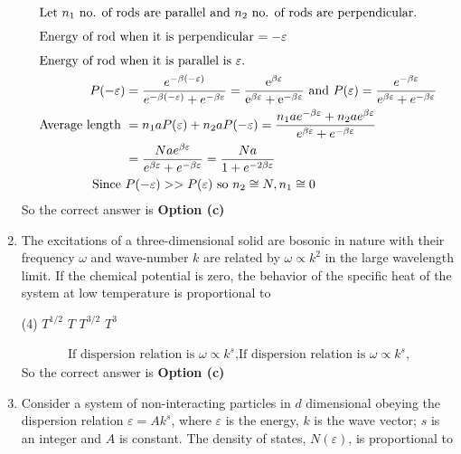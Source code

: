 \begin{enumerate}
\begin{answer}
	\begin{align*}
	\intertext{Let $n_{1}$ no. of rods are parallel and $n_{2}$ no. of rods are perpendicular.}
	\intertext{Energy of rod when it is perpendicular $=-\varepsilon$}
	\intertext{Energy of rod when it is parallel is $\varepsilon$.}
	P(-\varepsilon)&=\frac{e^{-\beta(-\varepsilon)}}{e^{-\beta(-\varepsilon)}+e^{-\beta \varepsilon}}=\frac{\mathrm{e}^{\beta \varepsilon}}{\mathrm{e}^{\beta \varepsilon}+\mathrm{e}^{-\beta \varepsilon}}\text{ and }P(\varepsilon)=\frac{e^{-\beta \varepsilon}}{e^{\beta \varepsilon}+e^{-\beta \varepsilon}}\\
	\text{Average length }&=n_{1} a P(\varepsilon)+n_{2} a P(-\varepsilon)=\frac{n_{1} a e^{-\beta \varepsilon}+n_{2} a e^{\beta \varepsilon}}{e^{\beta \varepsilon}+e^{-\beta \varepsilon}}\\&=\frac{N a e^{\beta \varepsilon}}{e^{\beta \varepsilon}+e^{-\beta \varepsilon}}=\frac{N a}{1+e^{-2 \beta \varepsilon}}\\
	\text{Since }&P(-\varepsilon)>>P(\varepsilon)\text{ so }n_{2} \cong N, n_{1} \cong 0
	\end{align*}
	So the correct answer is \textbf{Option (c)}
\end{answer}
	\item The excitations of a three-dimensional solid are bosonic in nature with their frequency $\omega$ and wave-number $k$ are related by $\omega \propto k^{2}$ in the large wavelength limit. If the chemical potential is zero, the behavior of the specific heat of the system at low temperature is proportional to
	{}
	\begin{tasks}(4)
		\task[\textbf{a.}] $T^{1 / 2}$
		\task[\textbf{b.}] $T$
		\task[\textbf{c.}]  $T^{3 / 2}$
		\task[\textbf{d.}] $T^{3}$
	\end{tasks}
\begin{answer}
	\begin{align*}
	\text{If dispersion relation is $\omega \propto k^{s}$,}
	\text{If dispersion relation is $\omega \propto k^{s}$,}
	\end{align*}
	So the correct answer is \textbf{Option (c)}
\end{answer}
	\item Consider a system of non-interacting particles in $d$ dimensional obeying the dispersion relation $\varepsilon=A k^{s}$, where $\varepsilon$ is the energy, $k$ is the wave vector; $s$ is an integer and $A$ is constant. The density of states, $N(\varepsilon)$, is proportional to
	{}

\end{enumerate}
